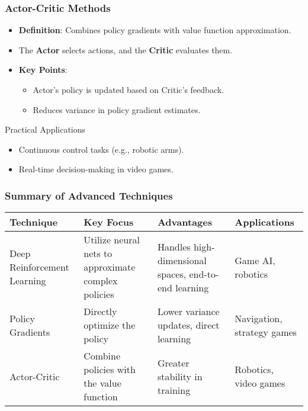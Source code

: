 \documentclass[aspectratio=169]{beamer}
\begin{document}
\begin{frame}[fragile]
    \frametitle{Actor-Critic Methods}
    \begin{itemize}
        \item \textbf{Definition}: Combines policy gradients with value function approximation.
        \item The \textbf{Actor} selects actions, and the \textbf{Critic} evaluates them.
        \item \textbf{Key Points}:
            \begin{itemize}
                \item Actor's policy is updated based on Critic’s feedback.
                \item Reduces variance in policy gradient estimates.
            \end{itemize}
    \end{itemize}

    \begin{block}{Practical Applications}
        \begin{itemize}
            \item Continuous control tasks (e.g., robotic arms).
            \item Real-time decision-making in video games.
        \end{itemize}
    \end{block}
\end{frame}

\begin{frame}[fragile]
    \frametitle{Summary of Advanced Techniques}
    \begin{center}
    \begin{tabular}{|l|l|l|l|}
        \hline
        \textbf{Technique} & \textbf{Key Focus} & \textbf{Advantages} & \textbf{Applications} \\
        \hline
        Deep Reinforcement Learning & Utilize neural nets to approximate complex policies & Handles high-dimensional spaces, end-to-end learning & Game AI, robotics \\
        \hline
        Policy Gradients & Directly optimize the policy & Lower variance updates, direct learning & Navigation, strategy games \\
        \hline
        Actor-Critic & Combine policies with the value function & Greater stability in training & Robotics, video games \\
        \hline
    \end{tabular}
    \end{center}
\end{frame}
\end{document}
